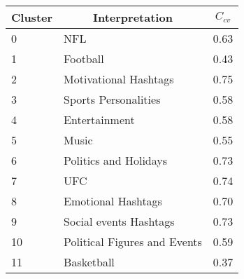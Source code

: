 \begin{table}[h]
\centering
\begin{tabular}{|l|l|l|}
\hline
\multicolumn{1}{|c|}{\textbf{Cluster}} & \multicolumn{1}{c|}{\textbf{Interpretation}}                    & \multicolumn{1}{c|}{\textbf{$C_{cv}$}} \\ \hline
0                                         & NFL                                                             & 0.63                                    \\ \hline
1                                         & Football                                                        & 0.43                                    \\ \hline
2                                         & Motivational Hashtags                                           & 0.75                                    \\ \hline
3                                         & Sports Personalities                                            & 0.58                                    \\ \hline
4                                         & Entertainment                                   & 0.58                                    \\ \hline
5                                         & Music                                                           & 0.55                                    \\ \hline
6                                         & Politics and Holidays                                           & 0.73                                    \\ \hline
7                                         & UFC                                                             & 0.74                                    \\ \hline
8                                         & Emotional Hashtags                                              & 0.70                                    \\ \hline
9                                         & Social events Hashtags                                          & 0.73                                    \\ \hline
10                                        & Political Figures and Events                                    & 0.59                                    \\ \hline
11                                        & Basketball                                                      & 0.37                                    \\ \hline

\end{tabular}
\end{table}
